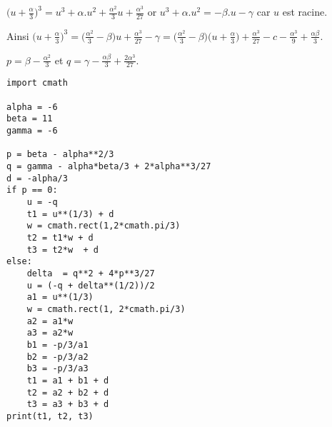 \begin{Answer}


$\bigl(u+\frac \alpha 3\bigr)^3 = u^3+\alpha.u^2+\frac {\alpha^2}3u+\frac {\alpha^3}{27}$ or $u^3+\alpha.u^2 = -\beta.u-\gamma$ car $u$ est racine.

Ainsi $\bigl(u+\frac \alpha 3\bigr)^3 = \bigl(\frac {\alpha^2}3 - \beta)u+\frac {\alpha^3}{27}-\gamma
=\bigl(\frac {\alpha^2}3 - \beta)\bigl(u+\frac \alpha3\bigr)+\frac {\alpha^3}{27}-c-\frac {\alpha^3}9+\frac{\alpha \beta}3$.

$p = \beta - \frac {\alpha^2}3$ et $q = \gamma - \frac{\alpha\beta}3+\frac {2\alpha^3}{27}$.
\begin{lstlisting}
import cmath

alpha = -6
beta = 11
gamma = -6

p = beta - alpha**2/3
q = gamma - alpha*beta/3 + 2*alpha**3/27
d = -alpha/3
if p == 0:
    u = -q
    t1 = u**(1/3) + d
    w = cmath.rect(1,2*cmath.pi/3)
    t2 = t1*w + d
    t3 = t2*w  + d
else:
    delta  = q**2 + 4*p**3/27
    u = (-q + delta**(1/2))/2
    a1 = u**(1/3)
    w = cmath.rect(1, 2*cmath.pi/3)
    a2 = a1*w
    a3 = a2*w 
    b1 = -p/3/a1
    b2 = -p/3/a2
    b3 = -p/3/a3
    t1 = a1 + b1 + d 
    t2 = a2 + b2 + d 
    t3 = a3 + b3 + d 
print(t1, t2, t3)
\end{lstlisting}
\newpage
\end{Answer}

